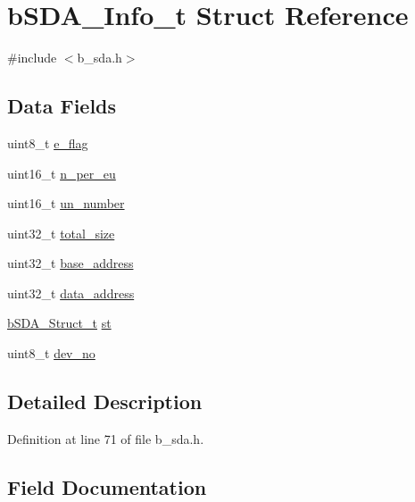 \hypertarget{structb_s_d_a___info__t}{}\section{b\+S\+D\+A\+\_\+\+Info\+\_\+t Struct Reference}
\label{structb_s_d_a___info__t}


{\ttfamily \#include $<$b\+\_\+sda.\+h$>$}

\subsection*{Data Fields}
\begin{DoxyCompactItemize}
\item 
uint8\+\_\+t \mbox{\hyperlink{structb_s_d_a___info__t_ada1f0203dd8dbfc9e79623ecc19baab7}{e\+\_\+flag}}
\item 
uint16\+\_\+t \mbox{\hyperlink{structb_s_d_a___info__t_aead7729865941bd802dfe73093bc4f0a}{n\+\_\+per\+\_\+eu}}
\item 
uint16\+\_\+t \mbox{\hyperlink{structb_s_d_a___info__t_a58c3c2f1f7c4bc785b72be555b017bc4}{un\+\_\+number}}
\item 
uint32\+\_\+t \mbox{\hyperlink{structb_s_d_a___info__t_acdfd526bb392e1ee59a3c6c545891b48}{total\+\_\+size}}
\item 
uint32\+\_\+t \mbox{\hyperlink{structb_s_d_a___info__t_a904bfc784ec019bfdea0236c862aea9b}{base\+\_\+address}}
\item 
uint32\+\_\+t \mbox{\hyperlink{structb_s_d_a___info__t_a80d68ca9cbeea24d62a23d9e35a67c22}{data\+\_\+address}}
\item 
\mbox{\hyperlink{structb_s_d_a___struct__t}{b\+S\+D\+A\+\_\+\+Struct\+\_\+t}} \mbox{\hyperlink{structb_s_d_a___info__t_a337a375940bfd3562a3864408833c9cb}{st}}
\item 
uint8\+\_\+t \mbox{\hyperlink{structb_s_d_a___info__t_a858e2685fb0034acadcd8d48cf6f02b2}{dev\+\_\+no}}
\end{DoxyCompactItemize}


\subsection{Detailed Description}


Definition at line 71 of file b\+\_\+sda.\+h.



\subsection{Field Documentation}
\mbox{\label{structb_s_d_a___info__t_a904bfc784ec019bfdea0236c862aea9b}} 
